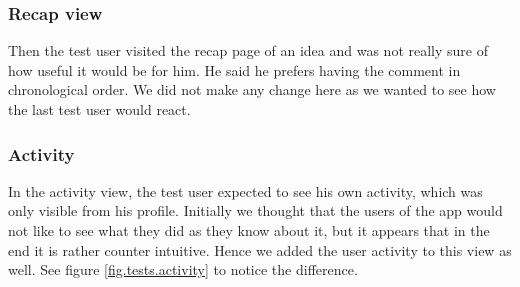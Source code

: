 \documentclass[a4paper,12pt,twoside]{article}
\begin{document}
\subsubsection*{Recap view}
Then the test user visited the recap page of an idea and was not really sure of how useful it would be for him.
He said he prefers having the comment in chronological order.
We did not make any change here as we wanted to see how the last test user would react.


\subsubsection*{Activity}
In the activity view, the test user expected to see his own activity, which was only visible from his profile.
Initially we thought that the users of the app would not like to see what they did as they know about it, but it appears that in the end it is rather counter intuitive.
Hence we added the user activity to this view as well.
See figure \ref{fig.tests.activity} to notice the difference.
\end{document}
